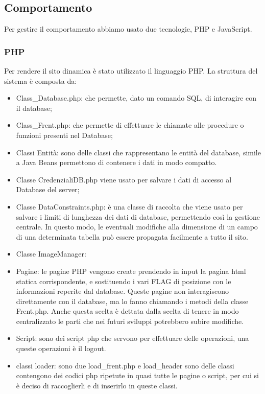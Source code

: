 \documentclass[1_relazione.tex]{subfiles}
\begin{document}
\subsection{Comportamento}
Per gestire il comportamento abbiamo usato due tecnologie, PHP e JavaScript.

\subsubsection{PHP}
Per rendere il sito dinamica \`{e} stato utilizzato il linguaggio PHP.
La struttura del sistema \`{e} composta da:
\begin{itemize}
    \item Class\_Database.php: che permette, dato un comando SQL, di interagire con il database;
    \item Class\_Frent.php: che permette di effettuare le chiamate alle procedure o funzioni presenti nel Database;
    \item Classi Entit\`{a}: sono delle classi che rappresentano le entit\`{a} del database, simile a Java Beans permettono di contenere i dati in modo compatto.
    \item Classe CredenzialiDB.php viene usato per salvare i dati di accesso al Database del server;
    \item Classe DataConstraints.php: \`{e} una classe di raccolta che viene usato per salvare i limiti di lunghezza dei dati di database, permettendo cos\`{i} la gestione centrale. In questo modo, le eventuali modifiche alla dimensione di un campo di una determinata tabella pu\`{o} essere propagata facilmente a tutto il sito.
    \item Classe ImageManager: %
    \item Pagine: le pagine PHP vengono create prendendo in input la pagina html statica corrispondente, e  sostituendo i vari FLAG di posizione con le informazioni reperite dal database. Queste pagine non interagiscono direttamente con il database, ma lo fanno chiamando i metodi della classe Frent.php. Anche questa scelta \`{e} dettata dalla scelta di tenere in modo centralizzato le parti che nei futuri sviluppi potrebbero subire modifiche.
    \item  Script: sono dei script php che servono per effettuare delle operazioni, una queste operazioni \`{e} il logout.
    \item classi loader: sono due load\_frent.php e load\_header sono delle classi contengono dei codici php ripetute in quasi tutte le pagine o script, per cui si \`{e} deciso di raccoglierli e di inserirlo in queste classi.
\end{itemize}
\end{document}
